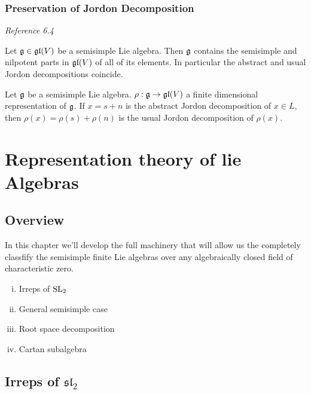 \subsection{Preservation of Jordon Decomposition}
\label{sub:preservation_of_jordon_decomposition}
\emph{Reference \cite{humphreys1972introduction} 6.4}

\begin{theorem}
    \label{thm:preservation_of_jordon_decomposition}
   Let $\mathfrak{g}\in \mathfrak{gl}(V)$  be a semisimple Lie algebra. Then $\mathfrak{g}$ contains the semisimple and nilpotent parts in $\mathfrak{gl}(V)$ of all of its elements. In  particular the abstract and usual Jordon decompositions coincide.
\end{theorem}

\begin{corollary}
    \label{cor:jordon}
    Let $\mathfrak{g}$ be a semisimple Lie algebra. $\rho: \mathfrak{g}\to \mathfrak{gl}(V)$ a finite dimensional representation of $\mathfrak{g}$. If $x=s + n$ is the abstract Jordon decomposition of $x\in L$, then $\rho(x)=\rho(s) + \rho(n)$ is the usual Jordon decomposition of $\rho(x)$.
\end{corollary}


\chapter{Representation theory of lie Algebras}
\label{cha:representation_theory_of_lie_algebras}



\section{Overview}
In this chapter we'll develop the full machinery that will allow us the completely classfify the semisimple finite Lie algebras over any algebraically closed field of characteristic zero.

\begin{enumerate}[(i)]
    \makethislistcompact
    \item Irreps of $\text{SL}_2$
    \item General semisimple case
    \item Root space decomposition
    \item Cartan subalgebra
\end{enumerate}


\section{Irreps of \texorpdfstring{$\mathfrak{sl}_2$}{sl\_2}}
\label{sec:irreps_of_sl_2}

